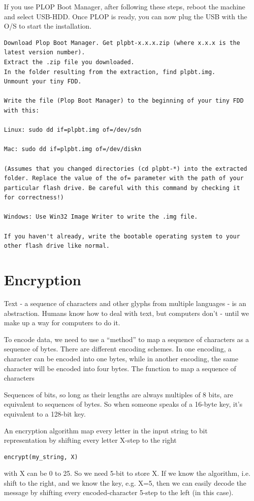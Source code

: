 If you use PLOP Boot Manager, after following these steps, reboot the machine
and select USB-HDD. Once PLOP is ready, you can now plug the USB with the O/S to
start the installation.
\begin{verbatim}
Download Plop Boot Manager. Get plpbt-x.x.x.zip (where x.x.x is the latest version number).
Extract the .zip file you downloaded.
In the folder resulting from the extraction, find plpbt.img.
Unmount your tiny FDD.

Write the file (Plop Boot Manager) to the beginning of your tiny FDD with this:

Linux: sudo dd if=plpbt.img of=/dev/sdn

Mac: sudo dd if=plpbt.img of=/dev/diskn

(Assumes that you changed directories (cd plpbt-*) into the extracted folder. Replace the value of the of= parameter with the path of your particular flash drive. Be careful with this command by checking it for correctness!)

Windows: Use Win32 Image Writer to write the .img file.

If you haven't already, write the bootable operating system to your other flash drive like normal.
\end{verbatim}

\section{Encryption}
\label{sec:encryption}

Text - a sequence of characters and other glyphs from multiple languages - is an
abstraction. Humans know how to deal with text, but computers don't - until we
make up a way for computers to do it. 

To encode data, we need to use a ``method'' to map a sequence of characters as a
sequence of bytes. There are different encoding schemes. In one encoding, a
character can be encoded into one bytes, while in another encoding, the same
character will be encoded into four bytes.
The function to map a sequence of characters


Sequences of bits, so long as their lengths are always multiples of 8 bits, are
equivalent to sequences of bytes. So when someone speaks of a 16-byte key, it's
equivalent to a 128-bit key. 

An encryption algorithm map every letter in the input string to bit
representation by shifting every letter X-step to the right
\begin{verbatim}
encrypt(my_string, X)
\end{verbatim}
with X can be 0 to 25. So we need 5-bit to store X. If we know the algorithm,
i.e. shift to the right, and we know the key, e.g. X=5, then we can easily
decode the message by shifting every encoded-character 5-step to the left (in
this case).

